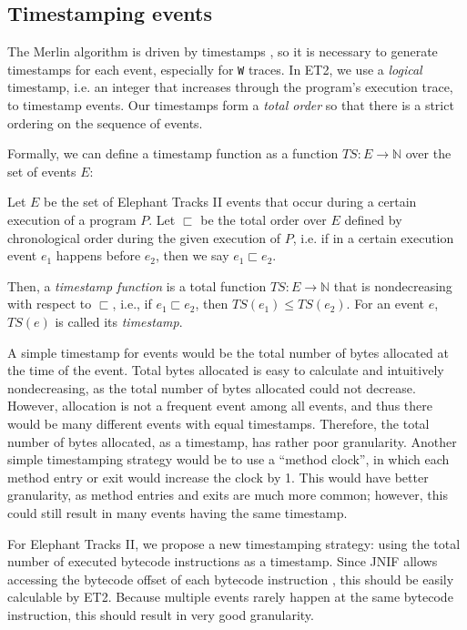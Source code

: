\subsection{Timestamping events}
\label{subsec:timestamp}
The Merlin algorithm is driven by timestamps \citep{Merlin}, so it is necessary to generate timestamps for each event, especially for \lstinline{W} traces.
In ET2, we use a \emph{logical} timestamp, i.e. an integer that increases through the program's execution trace, to timestamp events. Our timestamps form a
\emph{total order} so that there is a strict ordering on the sequence of events.

Formally, we can define a timestamp function as a function $TS : E \to \mathbb{N}$ over the set of events $E$:
\theoremstyle{definition}
\begin{definition}
  Let $E$ be the set of Elephant Tracks II events that occur during a certain execution of a program $P$. Let $\sqsubset$ be the total order
  over $E$ defined by chronological order during the given execution of $P$, i.e. if in a certain execution event $e_1$ happens before $e_2$, then
  we say $e_1 \sqsubset e_2$.
  
  Then, a \emph{timestamp function} is a total function $TS : E \to \mathbb{N}$ that is nondecreasing with respect to $\sqsubset$, i.e., if
  $e_1 \sqsubset e_2$, then $TS(e_1) \leq TS(e_2)$. For an event $e$, $TS(e)$ is called its \emph{timestamp}.
\end{definition}

A simple timestamp for events would be the total number of bytes allocated at the time of the event. Total bytes allocated is easy to calculate and
intuitively nondecreasing, as the total number of bytes allocated could not decrease. However, allocation is not a frequent event among
all events, and thus there would be many different events with equal timestamps. Therefore, the total number of bytes allocated, as a timestamp, has
rather poor granularity. Another simple timestamping strategy would be to use a ``method clock'', in which each method entry or exit would increase
the clock by 1. This would have better granularity, as method entries and exits are much more common; however, this could still result in many events
having the same timestamp.

For Elephant Tracks II, we propose a new timestamping strategy: using the total number of executed bytecode instructions as a timestamp. Since JNIF allows
accessing the bytecode offset of each bytecode instruction \citep{JNIF}, this should be easily calculable by ET2. Because multiple events rarely happen at
the same bytecode instruction, this should result in very good granularity.

